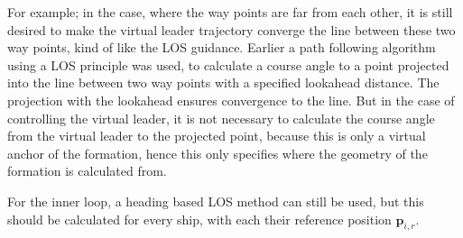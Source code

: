For example; in the case, where the way points are far from each
other, it is still desired to make the virtual leader trajectory
converge the line between these two way points, kind of like the
\ac{LOS} guidance. Earlier a path following algorithm using a \ac{LOS}
principle was used, to calculate a course angle to a point projected
into the line between two way points with a specified lookahead
distance. The projection with the lookahead ensures convergence to the
line. But in the case of controlling the virtual leader, it is not
necessary to calculate the course angle from the virtual leader to the
projected point, because this is only a virtual anchor of the
formation, hence this only specifies where the geometry of the
formation is calculated from. 

For the inner loop, a heading based \ac{LOS} method can still be used,
but this should be calculated for every ship, with each their
reference position $\mathbf{p}_{i,r}$.

